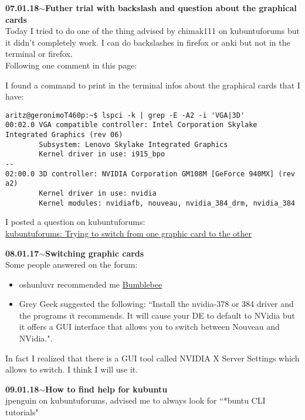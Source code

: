 \documentclass[11pt,a4paper]{article}
\newenvironment{loggentry}[2]%
{\noindent\textbf{#1}\hspace{1cm}$\mathbf{\sim}$\text{ }\textbf{#2}\\}{\vspace{0.5cm}}
\begin{document}
\begin{loggentry}{07.01.18}{Futher trial with backslash and question about the graphical cards}
Today I tried to do one of the thing advised by chimak111 on kubuntuforums but it didn't completely work. I can do backslashes in firefox or anki but not in the terminal or firefox.\\
Following one comment in this page:

I found a command to print in the terminal infos about the graphical cards that I have:
\begin{verbatim}
aritz@geronimoT460p:~$ lspci -k | grep -E -A2 -i 'VGA|3D'
00:02.0 VGA compatible controller: Intel Corporation Skylake Integrated Graphics (rev 06)
        Subsystem: Lenovo Skylake Integrated Graphics
        Kernel driver in use: i915_bpo
--
02:00.0 3D controller: NVIDIA Corporation GM108M [GeForce 940MX] (rev a2)
        Kernel driver in use: nvidia
        Kernel modules: nvidiafb, nouveau, nvidia_384_drm, nvidia_384
\end{verbatim}
I posted a question on kubuntuforums:\\
\href{https://www.kubuntuforums.net/showthread.php/72857-Trying-to-switch-from-one-graphic-card-to-the-other?p=408816#post408816}{kubuntuforums: Trying to switch from one graphic card to the other}
\end{loggentry}

\begin{loggentry}{08.01.17}{Switching graphic cards}
Some people answered on the forum: 
\begin{itemize}
\item oshunluvr recommended me \href{https://wiki.ubuntu.com/Bumblebee#Installation}{Bumblebee}
\item Grey Geek suggested the following: ``Install the nvidia-378 or 384 driver and the programs it recommends. It will cause your DE to default to NVidia but it offers a GUI interface that allows you to switch between Nouveau and NVidia.".
\end{itemize}
In fact I realized that there is a GUI tool called NVIDIA X Server Settings which allows to switch. I think I will use it.
\end{loggentry}

\begin{loggentry}{09.01.18}{How to find help for kubuntu}
jpenguin on kubuntuforums, advised me to always look for ``*buntu CLI tutorials"
\end{loggentry}
\end{document}

